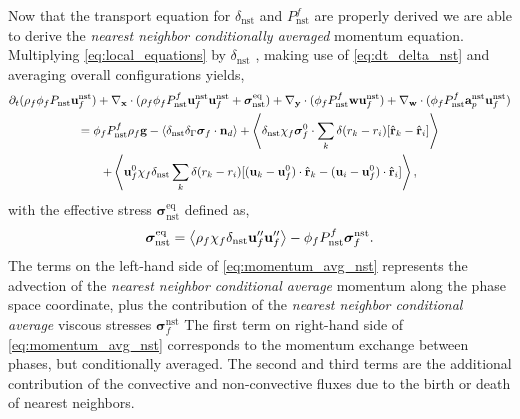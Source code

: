 Now that the transport equation for $\delta_\text{nst}$ and $P_\text{nst}^f$ are properly derived we are able to derive the \textit{nearest neighbor conditionally averaged} momentum equation. 
Multiplying \ref{eq:local_equations} by $\delta_\text{nst}$ , making use of \ref{eq:dt_delta_nst} and averaging overall configurations yields, 
\begin{multline}
    \pddt (\rho_f\phi_f P_\text{nst} \textbf{u}^\text{nst}_f)
    + \pddx\cdot (
        \rho_f\phi_fP_\text{nst}^f \textbf{u}^\text{nst}_f\textbf{u}^\text{nst}_f 
        +\bm\sigma_\text{nst}^\text{eq})
    + \pddy\cdot (\phi_fP_\text{nst}^f \textbf{w}\textbf{u}_f^\text{nst} )
    + \pddw\cdot (\phi_fP_\text{nst}^f \textbf{a}_p^\text{nst} \textbf{u}_f^\text{nst} )\\
    = 
    \phi_fP_\text{nst}^f  \rho_f \textbf{g}
    - \avg{\delta_\text{nst}\delta_\Gamma \bm\sigma_f \cdot \textbf{n}_d} 
    +\avg{
        \delta_\text{nst}
        \chi_f \bm\sigma_f^0 \cdot
        \sum_k 
        \delta(r_k - r_i)
        [\hat{\textbf{r}}_k - \hat{\textbf{r}}_i]}\\
    +\avg{
         \textbf{u}_f^0\chi_f \delta_\text{nst}
        \sum_k 
        \delta(r_k - r_i)
        [(\textbf{u}_k - \textbf{u}_f^0) \cdot \hat{\textbf{r}}_k - (\textbf{u}_i- \textbf{u}_f^0)  \cdot \hat{\textbf{r}}_i]},
    \label{eq:momentum_avg_nst}
\end{multline}
with the effective stress $\bm\sigma_\text{nst}^\text{eq}$ defined as, 
\begin{equation}
    \bm\sigma_\text{nst}^\text{eq}=
    \left<\rho_f\chi_f\delta_\text{nst} \textbf{u}''_f\textbf{u}''_f\right> 
    - \phi_f P_\text{nst}^f \bm\sigma^\text{nst}_f. 
\end{equation}
The terms on the left-hand side of \ref{eq:momentum_avg_nst} represents the advection of the \textit{nearest neighbor conditional average} momentum along the phase space coordinate, plus the contribution of the \textit{nearest neighbor conditional average} viscous stresses $\bm\sigma^\text{nst}_f$
The first term on right-hand side of \ref{eq:momentum_avg_nst} corresponds to the momentum exchange between phases, but conditionally averaged. 
The second and third terms are the additional contribution of the convective and non-convective fluxes due to the birth or death of nearest neighbors. 

